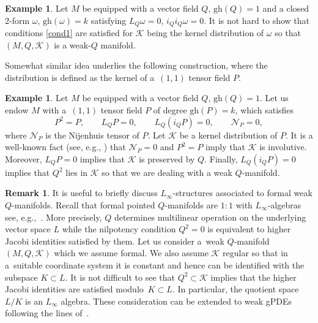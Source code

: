 \documentclass[pdftex]{sigma}
\numberwithin{equation}{section}
\theoremstyle{definition}
\newtheorem{Example}[Theorem]{Example}
\newtheorem{Remark}[Theorem]{Remark}
\newcommand{\changed}[1]{{#1}}
\newcommand{\gh}[1]{\mathrm{gh}(#1)}
\def\cK{\mathcal{K}}
\def\cN{\mathcal{N}}
\begin{document}
\begin{Example}%
 Let $M$ be equipped with a vector field $Q$, $\gh{Q}=1$ and a closed 2-form $\omega$, $\gh{\omega}=k$ satisfying $L_Q\omega=0$, $i_Qi_Q\omega=0$. It is not hard to show that conditions \eqref{cond1} are satisfied for $\cK$ being the kernel distribution of $\omega$ so that $(M,Q,\cK)$ is a weak-$Q$ manifold.
\end{Example}
Somewhat similar idea underlies the following construction, where the distribution is defined as the kernel of a~$(1,1)$ tensor field $P$.
\begin{Example} \label{ex:projector}
 Let $M$ be equipped with a vector field $Q$, $\gh{Q}=1$. Let us endow $M$ with a~$(1,1)$ tensor field $P$ of degree $\gh{P}=k$, which satisfies
 \begin{equation*}%
 P^2=P, \qquad L_QP=0,\qquad L_Q(i_QP)=0, \qquad \cN_P=0,
 \end{equation*}
 where $ \cN_P$ is the Nijenhuis tensor of $P$. Let $\mathcal{K}$ be a kernel distribution of $P$. It is a well-known fact (see, e.g., \cite{Kobayashi:1962a}) that $\cN_P=0$ and $P^2=P$ imply that $\mathcal{K}$ is involutive. Moreover, $L_QP=0$ implies that $\cK$ is preserved by $Q$. Finally, $L_Q(i_QP)=0$ implies that $Q^2$ lies in $\mathcal{K}$ so that we are dealing with a weak $Q$-manifold.
\end{Example}

\begin{Remark}
 It is useful to briefly discuss $L_{\infty}$-structures associated to formal weak $Q$-manifolds. Recall that formal pointed $Q$-manifolds are $1:1$ with $L_\infty$-algebras \changed{see, e.g.,~\cite{Alexandrov:1995kv,Kontsevich:1997vb}}. More precisely, $Q$ determines multilinear operation on the underlying vector space $L$ while the nilpotency condition $Q^2=0$ is equivalent to higher Jacobi identities satisfied by them. Let us consider a~weak $Q$-manifold $(M,Q,\mathcal{K})$ which we assume formal. We also assume $\cK$ regular so that in a~suitable coordinate system it is constant and hence can be identified with the subspace $K\subset L$. It is not difficult to see that $Q^2\subset \cK$ implies that the higher Jacobi identities are satisfied modulo~${K\subset L}$. In particular, the quotient space $L/K$ is an $L_\infty$ algebra. These consideration can be extended to weak gPDEs following the lines of~\cite{Grigoriev:2023lcc}.
\end{Remark}
\end{document}

